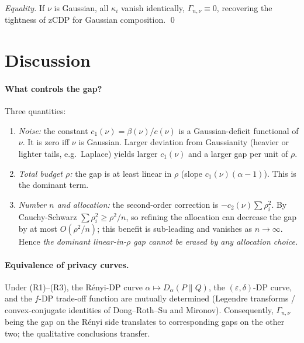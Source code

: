 \documentclass[11pt]{article}
\theoremstyle{definition}
\newcommand{\eps}{\varepsilon}
\begin{document}
\smallskip
\noindent\emph{Equality.} If $\nu$ is Gaussian, all $\kappa_i$ vanish identically, $\Gamma_{n,\nu}\equiv 0$, recovering the tightness of zCDP for Gaussian composition. \qed

\section{Discussion}

\paragraph{What controls the gap?} Three quantities:
\begin{enumerate}[label=(\roman*),leftmargin=*]
\item \emph{Noise:} the constant $c_1(\nu)=\beta(\nu)/c(\nu)$ is a Gaussian-deficit functional of $\nu$. It is zero iff $\nu$ is Gaussian. Larger deviation from Gaussianity (heavier or lighter tails, e.g.\ Laplace) yields larger $c_1(\nu)$ and a larger gap per unit of $\rho$.
\item \emph{Total budget $\rho$:} the gap is at least linear in $\rho$ (slope $c_1(\nu)(\alpha-1)$). This is the dominant term.
\item \emph{Number $n$ and allocation:} the second-order correction is $-c_2(\nu)\sum\rho_i^2$. By Cauchy-Schwarz $\sum\rho_i^2\ge \rho^2/n$, so refining the allocation can decrease the gap by at most $O(\rho^2/n)$; this benefit is sub-leading and vanishes as $n\to\infty$. Hence \emph{the dominant linear-in-$\rho$ gap cannot be erased by any allocation choice.}
\end{enumerate}

\paragraph{Equivalence of privacy curves.} Under (R1)--(R3), the R\'enyi-DP curve $\alpha\mapsto D_\alpha(P\|Q)$, the $(\eps,\delta)$-DP curve, and the $f$-DP trade-off function are mutually determined (Legendre transforms / convex-conjugate identities of Dong--Roth--Su and Mironov). Consequently, $\Gamma_{n,\nu}$ being the gap on the R\'enyi side translates to corresponding gaps on the other two; the qualitative conclusions transfer.
\end{document}
